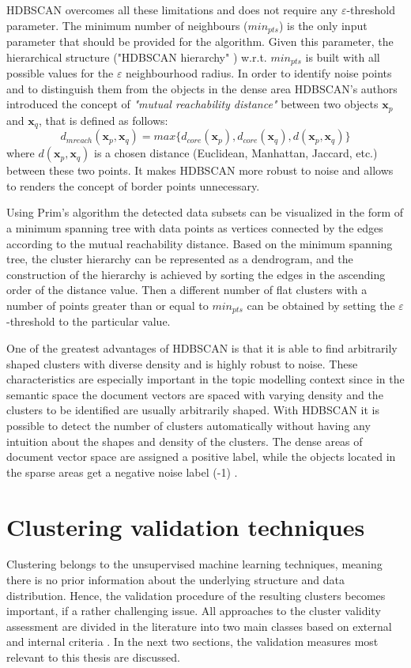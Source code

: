 \documentclass[fontsize=12pt,a4paper,twoside,openany]{scrbook}
\begin{document}
HDBSCAN overcomes all these limitations and does not require any \(\varepsilon\)-threshold parameter. The minimum number of neighbours (\(min_{pts}\)) is the only input parameter that should be provided for the algorithm. Given this parameter, the hierarchical structure ("HDBSCAN hierarchy" \parencite{Campello13}) w.r.t. \(min_{pts}\) is built with all possible values for the \(\varepsilon\) neighbourhood radius. In order to identify noise points and to distinguish them from the objects in the dense area HDBSCAN's authors introduced the concept of \emph{"mutual reachability distance"} \parencite[p.~163]{Campello13} between two objects \(\textbf{x}_p\) and \(\textbf{x}_q\), that is defined as follows: \[d_{mreach}(\textbf{x}_p, \textbf{x}_q) = max\{d_{core}(\textbf{x}_p), d_{core}(\textbf{x}_q), d(\textbf{x}_p, \textbf{x}_q)\}\] 
where \(d(\textbf{x}_p, \textbf{x}_q)\) is a chosen distance (Euclidean, Manhattan, Jaccard, etc.) between these two points. It makes HDBSCAN more robust to noise and allows to renders the concept of border points unnecessary. 

Using Prim's algorithm \parencite{Mamun16} the detected data subsets can be visualized in the form of a minimum spanning tree with data points as vertices connected by the edges according to the mutual reachability distance. Based on the minimum spanning tree, the cluster hierarchy can be represented as a dendrogram, and the construction of the hierarchy is achieved by sorting the edges in the ascending order of the distance value. Then a different number of flat clusters with a number of points greater than or equal to \(min_{pts}\) can be obtained by setting the \(\varepsilon\)-threshold to the particular value.

One of the greatest advantages of HDBSCAN is that it is able to find arbitrarily shaped clusters with diverse density and is highly robust to noise. These characteristics are especially important in the topic modelling context since in the semantic space the document vectors are spaced with varying density \parencite{Angelov20} and the clusters to be identified are usually arbitrarily shaped. With HDBSCAN it is possible to detect the number of clusters automatically without having any intuition about the shapes and density of the clusters. The dense areas of document vector space are assigned a positive label, while the objects located in the sparse areas get a negative noise label (-1) \parencite{Angelov20}.

\section{Clustering validation techniques}
\label{sec:validation}
Clustering belongs to the unsupervised machine learning techniques, meaning there is no prior information about the underlying structure and data distribution. Hence, the validation procedure of the resulting clusters becomes important, if a rather challenging issue. All approaches to the cluster validity assessment are divided in the literature into two main classes based on external and internal criteria \parencite{Halkidi01a}. In the next two sections, the validation measures most relevant to this thesis are discussed.
\end{document}
